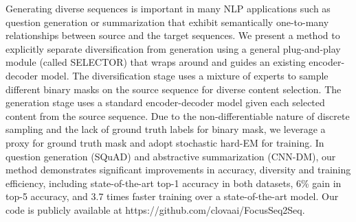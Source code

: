 Generating diverse sequences is important in many NLP applications such as question generation or summarization that exhibit semantically one-to-many relationships between source and the target sequences. We present a method to explicitly separate diversification from generation using a general plug-and-play module (called SELECTOR) that wraps around and guides an existing encoder-decoder model. The diversification stage uses a mixture of experts to sample different binary masks on the source sequence for diverse content selection. The generation stage uses a standard encoder-decoder model given each selected content from the source sequence. Due to the non-differentiable nature of discrete sampling and the lack of ground truth labels for binary mask, we leverage a proxy for ground truth mask and adopt stochastic hard-EM for training. In question generation (SQuAD) and abstractive summarization (CNN-DM), our method demonstrates significant improvements in accuracy, diversity and training efficiency, including state-of-the-art top-1 accuracy in both datasets, 6\% gain in top-5 accuracy, and 3.7 times faster training over a state-of-the-art model. Our code is publicly available at https://github.com/clovaai/FocusSeq2Seq.